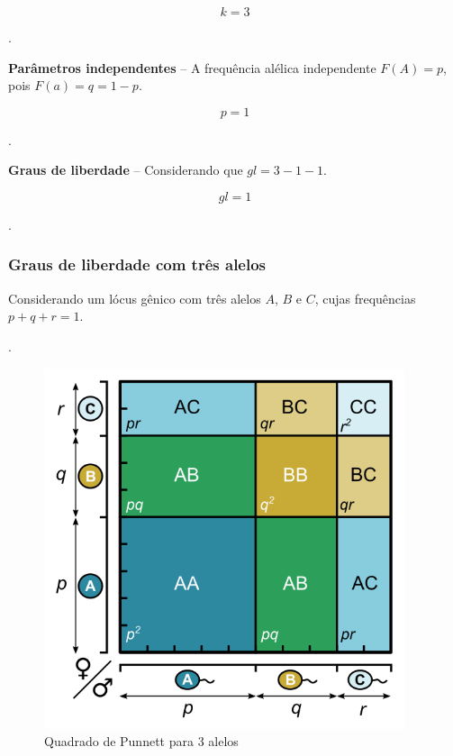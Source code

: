 \documentclass[
]{book}
\begin{document}
\[k=3\]

.\linebreak

\textbf{Parâmetros independentes} -- A frequência alélica independente \(F(A)=p\), pois \(F(a)=q=1-p\).

\[p=1\]

.\linebreak

\textbf{Graus de liberdade} -- Considerando que \(gl=3-1-1\).

\[gl=1\]

.\linebreak

\hypertarget{graus-de-liberdade-com-truxeas-alelos}{%
\subsubsection{Graus de liberdade com três alelos}\label{graus-de-liberdade-com-truxeas-alelos}}

Considerando um lócus gênico com três alelos \(A\), \(B\) e \(C\), cujas frequências \(p+q+r=1\).

.\linebreak

\begin{figure}

{\centering \includegraphics[width=400px]{figs/punnett_3alelles} 

}

\caption{Quadrado de Punnett para 3 alelos}\label{fig:gl3alelos}
\end{figure}
\end{document}
